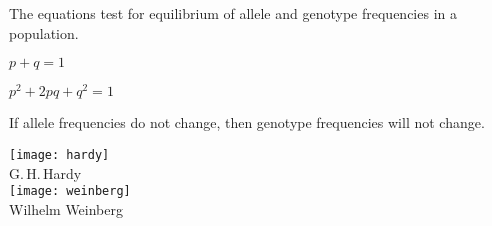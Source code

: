 \documentclass[t,handout]{beamer}  %
\begin{document}
% 
\begin{frame}[t]{The  equations test for equilibrium of allele and genotype frequencies in a population.}

	\vspace*{-\baselineskip}
	
	\begin{multicols}{2}
	
	\vspace*{0\baselineskip}
	
	\hangpara $p + q = 1$
	
	\hangpara $p^2 + 2pq + q^2 = 1$
	
	\vspace{\baselineskip}
	
	\hangpara If allele frequencies do not change, then genotype frequencies will not change.
	
	\vspace{\baselineskip}
	
	\hangpara {}
	
	\columnbreak
	
		{\centering \texttt{[image: hardy]}\\[-1ex]
		{\small G.\,H.\,Hardy}\\[1ex]

		\texttt{[image: weinberg]}\\[-1ex]
		{\small Wilhelm Weinberg}\par
		}
		
	\end{multicols}
	
\end{frame}
\end{document}
